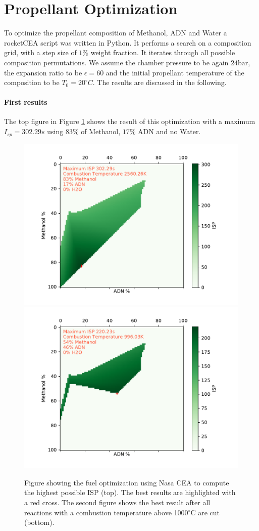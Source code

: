 \documentclass[12pt]{article}
\begin{document}
\section{Propellant Optimization}
To optimize the propellant composition of Methanol, ADN and Water a rocketCEA script was written in Python. It performs a search on a composition grid, with a step size of $1\%$ weight fraction. It iterates through all possible composition permutations. We assume the chamber pressure to be again $24\text{bar}$, the expansion ratio to be $\epsilon=60$ and the initial propellant temperature of the composition to be $T_0=20^{\circ}C$. The results are discussed in the following.

\paragraph{First results}
The top figure in Figure \ref{fig:fuel_optimization_all_results} shows the result of this optimization with a maximum $I_{sp}=302.29s$ using $83\%$ of Methanol, $17\%$ ADN and no Water.

\begin{figure}[!h]
	\centering
	\includegraphics[width=0.8\linewidth]{figures/b2_1.pdf}
	\includegraphics[width=0.8\linewidth]{figures/b2_2.pdf}
	\caption{Figure showing the fuel optimization using Nasa CEA to compute the highest possible ISP (top). The best results are highlighted with a red cross. The second figure shows the best result after all reactions with a combustion temperature above 1000$^\circ$C are cut (bottom).}
	\label{fig:fuel_optimization_all_results}
\end{figure}
\end{document}
